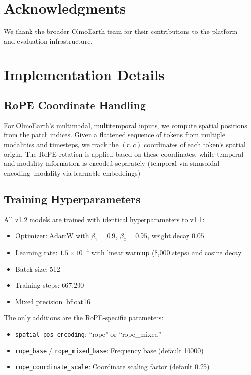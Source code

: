 \documentclass{article}
\begin{document}
\section*{Acknowledgments}

We thank the broader OlmoEarth team for their contributions to the platform and evaluation infrastructure.




\appendix

\section{Implementation Details}

\subsection{RoPE Coordinate Handling}

For OlmoEarth's multimodal, multitemporal inputs, we compute spatial positions from the patch indices. Given a flattened sequence of tokens from multiple modalities and timesteps, we track the $(r, c)$ coordinates of each token's spatial origin. The RoPE rotation is applied based on these coordinates, while temporal and modality information is encoded separately (temporal via sinusoidal encoding, modality via learnable embeddings).

\subsection{Training Hyperparameters}

All v1.2 models are trained with identical hyperparameters to v1.1:
\begin{itemize}
    \item Optimizer: AdamW with $\beta_1=0.9$, $\beta_2=0.95$, weight decay $0.05$
    \item Learning rate: $1.5 \times 10^{-4}$ with linear warmup (8,000 steps) and cosine decay
    \item Batch size: 512
    \item Training steps: 667,200
    \item Mixed precision: bfloat16
\end{itemize}

The only additions are the RoPE-specific parameters:
\begin{itemize}
    \item \texttt{spatial\_pos\_encoding}: ``rope'' or ``rope\_mixed''
    \item \texttt{rope\_base} / \texttt{rope\_mixed\_base}: Frequency base (default 10000)
    \item \texttt{rope\_coordinate\_scale}: Coordinate scaling factor (default 0.25)
\end{itemize}
\end{document}
